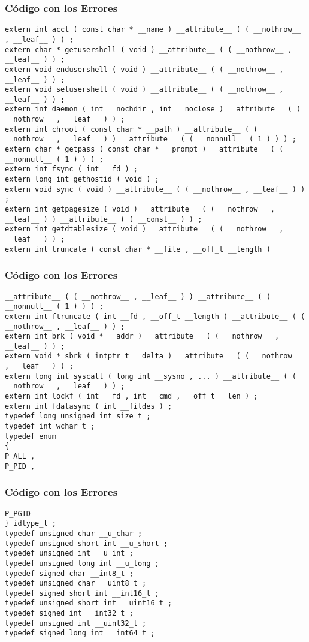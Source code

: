 \documentclass{beamer}
\begin{document}
\begin{frame}[fragile]
\frametitle{C\'odigo con los Errores}
\begin{lstlisting}[style=CStyle]
extern int acct ( const char * __name ) __attribute__ ( ( __nothrow__ , __leaf__ ) ) ; 
extern char * getusershell ( void ) __attribute__ ( ( __nothrow__ , __leaf__ ) ) ; 
extern void endusershell ( void ) __attribute__ ( ( __nothrow__ , __leaf__ ) ) ; 
extern void setusershell ( void ) __attribute__ ( ( __nothrow__ , __leaf__ ) ) ; 
extern int daemon ( int __nochdir , int __noclose ) __attribute__ ( ( __nothrow__ , __leaf__ ) ) ; 
extern int chroot ( const char * __path ) __attribute__ ( ( __nothrow__ , __leaf__ ) ) __attribute__ ( ( __nonnull__ ( 1 ) ) ) ; 
extern char * getpass ( const char * __prompt ) __attribute__ ( ( __nonnull__ ( 1 ) ) ) ; 
extern int fsync ( int __fd ) ; 
extern long int gethostid ( void ) ; 
extern void sync ( void ) __attribute__ ( ( __nothrow__ , __leaf__ ) ) ; 
extern int getpagesize ( void ) __attribute__ ( ( __nothrow__ , __leaf__ ) ) __attribute__ ( ( __const__ ) ) ; 
extern int getdtablesize ( void ) __attribute__ ( ( __nothrow__ , __leaf__ ) ) ; 
extern int truncate ( const char * __file , __off_t __length ) 
\end{lstlisting}
\end{frame}
\begin{frame}[fragile]
\frametitle{C\'odigo con los Errores}
\begin{lstlisting}[style=CStyle]
__attribute__ ( ( __nothrow__ , __leaf__ ) ) __attribute__ ( ( __nonnull__ ( 1 ) ) ) ; 
extern int ftruncate ( int __fd , __off_t __length ) __attribute__ ( ( __nothrow__ , __leaf__ ) ) ; 
extern int brk ( void * __addr ) __attribute__ ( ( __nothrow__ , __leaf__ ) ) ; 
extern void * sbrk ( intptr_t __delta ) __attribute__ ( ( __nothrow__ , __leaf__ ) ) ; 
extern long int syscall ( long int __sysno , ... ) __attribute__ ( ( __nothrow__ , __leaf__ ) ) ; 
extern int lockf ( int __fd , int __cmd , __off_t __len ) ; 
extern int fdatasync ( int __fildes ) ; 
typedef long unsigned int size_t ; 
typedef int wchar_t ; 
typedef enum 
{ 
P_ALL , 
P_PID , 
\end{lstlisting}
\end{frame}
\begin{frame}[fragile]
\frametitle{C\'odigo con los Errores}
\begin{lstlisting}[style=CStyle]
P_PGID 
} idtype_t ; 
typedef unsigned char __u_char ; 
typedef unsigned short int __u_short ; 
typedef unsigned int __u_int ; 
typedef unsigned long int __u_long ; 
typedef signed char __int8_t ; 
typedef unsigned char __uint8_t ; 
typedef signed short int __int16_t ; 
typedef unsigned short int __uint16_t ; 
typedef signed int __int32_t ; 
typedef unsigned int __uint32_t ; 
typedef signed long int __int64_t ; 
\end{lstlisting}
\end{frame}
\end{document}
